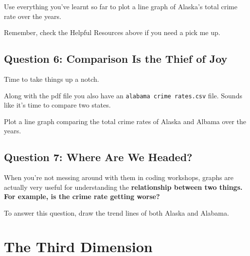 \documentclass{article}
\begin{document}
    Use everything you've learnt so far to plot a line graph of Alaska's total crime rate over the years.

    Remember, check the Helpful Resources above if you need a pick me up.

    \subsection{Question 6: Comparison Is the Thief of Joy}
    Time to take things up a notch.

    Along with the pdf file you also have an \texttt{alabama crime rates.csv} file. Sounds like it's time to compare two states.

    Plot a line graph comparing the total crime rates of Alaska and Albama over the years.

    \subsection{Question 7: Where Are We Headed?}
    When you're not messing around with them in coding workshops, graphs are actually very useful for understanding the \bfseries relationship \mdseries between two things. For example, is the crime rate getting worse?

    To answer this question, draw the trend lines of both Alaska and Alabama.

    \section{The Third Dimension}
\end{document}
